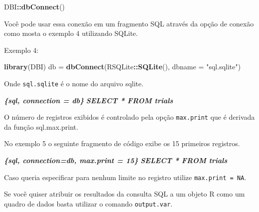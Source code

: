 \documentclass[
]{book}
\newenvironment{Shaded}{\begin{snugshade}}{\end{snugshade}}
\newcommand{\DataTypeTok}[1]{\textcolor[rgb]{0.13,0.29,0.53}{#1}}
\newcommand{\InformationTok}[1]{\textcolor[rgb]{0.56,0.35,0.01}{\textbf{\textit{#1}}}}
\newcommand{\KeywordTok}[1]{\textcolor[rgb]{0.13,0.29,0.53}{\textbf{#1}}}
\newcommand{\NormalTok}[1]{#1}
\newcommand{\OperatorTok}[1]{\textcolor[rgb]{0.81,0.36,0.00}{\textbf{#1}}}
\newcommand{\StringTok}[1]{\textcolor[rgb]{0.31,0.60,0.02}{#1}}
\begin{document}
\begin{Shaded}
\begin{Highlighting}[]
\NormalTok{DBI}\OperatorTok{::}\KeywordTok{dbConnect}\NormalTok{()}
\end{Highlighting}
\end{Shaded}

Você pode usar essa conexão em um fragmento SQL através da opção de conexão como mosta o exemplo 4 utilizando SQLite.

Exemplo 4:

\begin{Shaded}
\begin{Highlighting}[]
\KeywordTok{library}\NormalTok{(DBI)}
\NormalTok{db =}\StringTok{ }\KeywordTok{dbConnect}\NormalTok{(RSQLite}\OperatorTok{::}\KeywordTok{SQLite}\NormalTok{(), }\DataTypeTok{dbname =} \StringTok{"sql.sqlite"}\NormalTok{)}
\end{Highlighting}
\end{Shaded}

Onde \texttt{sql.sqlite} é o nome do arquivo sqlite.

\begin{Shaded}
\begin{Highlighting}[]
 \InformationTok{\textasciigrave{}\textasciigrave{}\textasciigrave{}\{sql, connection = db\}}
\InformationTok{SELECT * FROM trials}
\InformationTok{\textasciigrave{}\textasciigrave{}\textasciigrave{}}
\end{Highlighting}
\end{Shaded}

O número de registros exibidos é controlado pela opção \texttt{max.print} que é derivada da função sql.max.print.

No exemplo 5 o seguinte fragmento de código exibe os 15 primeiros registros.

\begin{Shaded}
\begin{Highlighting}[]
 \InformationTok{\textasciigrave{}\textasciigrave{}\textasciigrave{}\{sql, connection=db, max.print = 15\}}
\InformationTok{SELECT * FROM trials}
\InformationTok{\textasciigrave{}\textasciigrave{}\textasciigrave{}}
\end{Highlighting}
\end{Shaded}

Caso queria especificar para nenhum limite no registro utilize \texttt{max.print\ =\ NA}.

Se você quiser atribuir os resultados da consulta SQL a um objeto R como um quadro de dados basta utilizar o comando \texttt{output.var}.
\end{document}
